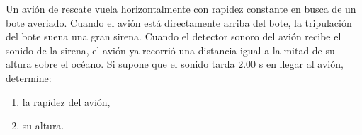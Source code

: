 \item Un avión de rescate vuela horizontalmente con rapidez constante en busca de un bote averiado. Cuando el avión está directamente arriba del bote, la tripulación del bote suena una gran sirena. Cuando el detector sonoro del avión recibe el sonido de la sirena, el avión ya recorrió una distancia igual a la mitad de su altura sobre el océano. Si supone que el sonido tarda 2.00 s en llegar al avión, determine:
\begin{enumerate}
    \item la rapidez del avión,
    \item su altura.
\end{enumerate}